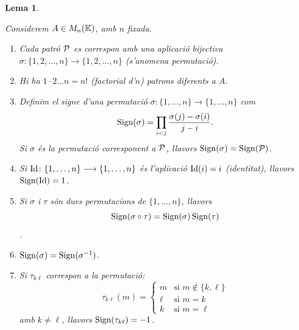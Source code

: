 \documentclass[
  11pt,
]{book}
\numberwithin{dummy}{section}
\theoremstyle{maincolornumbox}
\theoremstyle{blacknumex}
\theoremstyle{blacknumbox}
\theoremstyle{maincolornum}
\newtheorem{lemmaT}{Lema}[chapter]
\newenvironment{lemma}{\begin{pBox}\begin{lemmaT}}{\end{lemmaT}\end{pBox}}
\newlength\esp
\begin{document}
\begin{lemma}
\protect\hypertarget{lem:permutacions}{}\label{lem:permutacions}

Considerem
\(A\in M_n(\mathbb{K})\), amb \(n\) fixada.

\begin{enumerate}
\def\labelenumi{\arabic{enumi}.}
\item
  Cada patró \(\mathcal{P}\) es correspon amb una aplicació bijectiva
  \(\sigma\colon \{1,2,\dots,n\} \to \{1,2,\dots,n\}\) (s'anomena
  \emph{permutació}).
\item
  Hi ha \(1\cdot 2 \dots n = n!\) (factorial d'\(n\)) patrons diferents a
  \(A\).
\item
  Definim el \emph{signe d'una permutació}
  \(\sigma\colon \{1,\dots,n\}\to\{1,\dots,n\}\) com
  \[\operatorname{Sign}(\sigma)=\prod_{i<j} \frac{\sigma(j)-\sigma(i)}{j-i} .\] Si
  \(\sigma\) és la permutació corresponent a \(\mathcal{P}\), llavors
  \(\operatorname{Sign}(\sigma)=\operatorname{Sign}(\mathcal{P})\).
\item
  Si \(\operatorname{Id}\colon \{1,\dots,n\}\longrightarrow\{1,\dots,n\}\) és l'aplicació
  \(\operatorname{Id}(i)=i\) (identitat), llavors \(\operatorname{Sign}(\operatorname{Id})=1\).
\item
  Si \(\sigma\) i \(\tau\) són dues permutacions de \(\{1,\dots, n\}\),
  llavors \[\operatorname{Sign}(\sigma\circ\tau)=\operatorname{Sign}(\sigma)\operatorname{Sign}(\tau)\].
\item
  \(\operatorname{Sign}(\sigma)=\operatorname{Sign}(\sigma^{-1})\).
\item
  Si \(\tau_{k\ell}\) correspon a la permutació:
  \[\tau_{k\ell}(m)=\left\{\begin{array}{ll} m & \text{si $m\not\in\{k,\ell\}$}\\ \ell & \text{si $m=k$} \\ k & \text{si $m=\ell$} \end{array} \right.\]
  amb \(k\neq \ell\), llavors \(\operatorname{Sign}(\tau_{k\ell})=-1\).
\end{enumerate}

\end{lemma}
\end{document}
